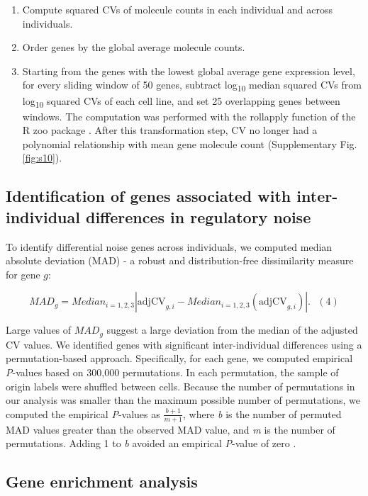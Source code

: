 \begin{enumerate}
\def\labelenumi{\arabic{enumi}.}
\item
  Compute squared CVs of molecule counts in each individual and across
  individuals.
\item
  Order genes by the global average molecule counts.
\item
  Starting from the genes with the lowest global average gene expression
  level, for every sliding window of 50 genes, subtract
  log\textsubscript{10} median squared CVs from log\textsubscript{10}
  squared CVs of each cell line, and set 25 overlapping genes between
  windows. The computation was performed with the rollapply function of
  the R zoo package \citep{Zeileis2005}. After this transformation step,
  CV no longer had a polynomial relationship with mean gene molecule
  count (Supplementary Fig. \ref{fig:s10}).
\end{enumerate}

\subsection{Identification of genes associated with inter-individual
differences in regulatory
noise}\label{identification-of-genes-associated-with-inter-individual-differences-in-regulatory-noise}

To identify differential noise genes across individuals, we computed
median absolute deviation (MAD) - a robust and distribution-free
dissimilarity measure for gene $g$:

\[ MAD_{g} = Median_{i= 1,2,3} \left| \text{adjCV}_{g,i} -  Median_{i= 1,2,3} ({\text{adjCV}}_{g,i}) \right|. \,\,\,\,(4)\]

Large values of $MAD_{g}$ suggest a large deviation from the median of
the adjusted CV values. We identified genes with significant
inter-individual differences using a permutation-based approach.
Specifically, for each gene, we computed empirical \emph{P}-values based
on 300,000 permutations. In each permutation, the sample of origin
labels were shuffled between cells. Because the number of permutations
in our analysis was smaller than the maximum possible number of
permutations, we computed the empirical \emph{P}-values as
$\frac{b + 1}{m + 1}$, where \emph{b} is the number of permuted MAD
values greater than the observed MAD value, and \emph{m} is the number
of permutations. Adding 1 to \emph{b} avoided an empirical
\emph{P}-value of zero \citep{Phipson2010}.

\subsection{Gene enrichment analysis}\label{gene-enrichment-analysis}

